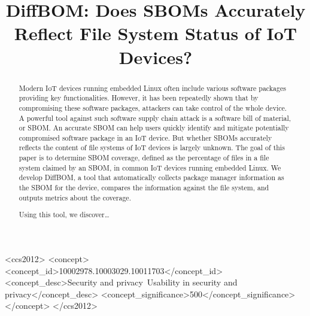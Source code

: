 \documentclass[sigconf, anonymous]{acmart}
\begin{document}
\title{DiffBOM: Does SBOMs Accurately Reflect File System Status of IoT Devices?} %

\begin{abstract}
Modern IoT devices running embedded Linux often include various software packages providing key functionalities. However, it has been repeatedly shown that by compromising these software packages, attackers can take control of the whole device. A powerful tool against such software supply chain attack is a software bill of material, or SBOM. An accurate SBOM can help users quickly identify and mitigate potentially compromised software package in an IoT device. But whether SBOMs accurately reflects the content of file systems of IoT devices is largely unknown. The goal of this paper is to determine SBOM coverage, defined as the percentage of files in a file system claimed by an SBOM, in common IoT devices running embedded Linux. We develop DiffBOM, a tool that automatically collects package manager information as the SBOM for the device, compares the information against the file system, and outputs metrics about the coverage.\par
Using this tool, we discover…
\end{abstract}

\begin{CCSXML}
<ccs2012>
<concept>
<concept_id>10002978.10003029.10011703</concept_id>
<concept_desc>Security and privacy~Usability in security and privacy</concept_desc>
<concept_significance>500</concept_significance>
</concept>
</ccs2012>
\end{CCSXML}



\maketitle




\end{document}
